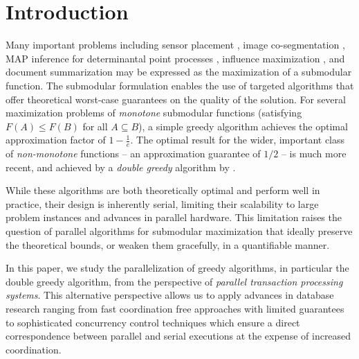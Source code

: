 \documentclass{article} %
\begin{document}
\begin{abstract}

\end{abstract}

\section{Introduction}



Many important problems including sensor placement \cite{krauseGuestrin11}, image co-segmentation \cite{kim11}, MAP inference for determinantal point processes \cite{gillenwater12}, influence maximization \cite{kkt03}, and document summarization \cite{lin11} may be expressed as the maximization of a submodular function.
The submodular formulation enables the use of targeted algorithms \cite{buchbinder2012,nemhauser1978} that offer theoretical worst-case guarantees on the quality of the solution.
For several maximization problems of \emph{monotone} submodular functions (satisfying $F(A) \leq F(B)$ for all $A \subseteq B$), a simple greedy algorithm \cite{nemhauser1978} achieves the optimal approximation factor of $1-\frac{1}{e}$.
The optimal result for the wider, important class of \emph{non-monotone} functions  -- an approximation guarantee of $1/2$ --  is much more recent, and achieved by a \emph{double greedy} algorithm by \citet{buchbinder2012}.


While these algorithms are both theoretically optimal and perform well in practice, their design is inherently serial, limiting their scalability to large problem instances and advances in parallel hardware.
This limitation raises the question of parallel algorithms for submodular maximization that ideally preserve the theoretical bounds, or weaken them gracefully, in a quantifiable manner.


In this paper, we study the parallelization of greedy algorithms, in particular the double greedy algorithm, from the perspective of \emph{parallel transaction processing systems}.
This alternative perspective allows us to apply advances in database research ranging from fast coordination free approaches with limited guarantees to sophisticated concurrency control techniques which ensure a direct correspondence between parallel and serial executions at the expense of increased coordination. %
\end{document}
